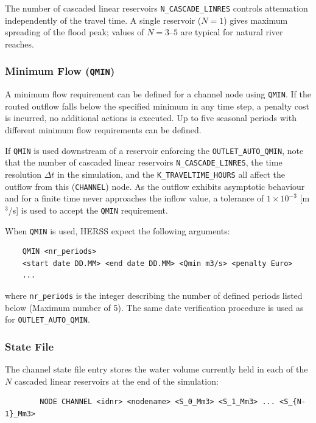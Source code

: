 \documentclass[a4paper, 12pt]{report}
\begin{document}
	The number of cascaded linear reservoirs \texttt{N\_CASCADE\_LINRES} controls
	attenuation independently of the travel time. A single reservoir ($N=1$) gives
	maximum spreading of the flood peak; values of $N = 3$--$5$ are typical for
	natural river reaches.
	
	\subsubsection{Minimum Flow (\texttt{QMIN})}

	A minimum flow requirement can be defined for a channel node using \texttt{QMIN}. If the
	routed outflow falls below the specified minimum in any time step, a penalty cost is incurred, no additional actions is executed.
	Up to five seasonal periods with different minimum flow requirements can be defined.

    If \texttt{QMIN} is used downstream of a reservoir enforcing the \texttt{OUTLET\_AUTO\_QMIN}, note that the number of cascaded linear reservoirs \texttt{N\_CASCADE\_LINRES}, the time resolution $\Delta t$ in the simulation, and the \texttt{K\_TRAVELTIME\_HOURS} all affect the outflow from this (\texttt{CHANNEL}) node. As the outflow exhibits asymptotic behaviour and for a finite time never approaches the inflow value, a tolerance of $1 \times 10^{-3}$ [m$^3$/s] is used to accept the \texttt{QMIN} requirement.

    When \texttt{QMIN} is used, HERSS expect the following arguments:
    \begin{verbatim}
	QMIN <nr_periods>
    <start date DD.MM> <end date DD.MM> <Qmin m3/s> <penalty Euro>
	...
	\end{verbatim}
    where \texttt{nr\_periods} is the integer describing the number of defined periods listed below (Maximum number of 5). The same date verification procedure is used as for \texttt{OUTLET\_AUTO\_QMIN}.

	\subsubsection{State File}

	The channel state file entry stores the water volume currently held in each of the $N$
	cascaded linear reservoirs at the end of the simulation:

	\begin{verbatim}
		NODE CHANNEL <idnr> <nodename> <S_0_Mm3> <S_1_Mm3> ... <S_{N-1}_Mm3>
	\end{verbatim}
\end{document}
